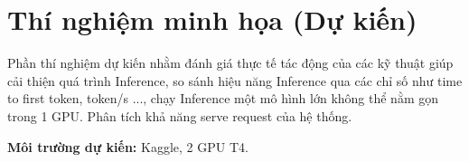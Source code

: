 \section{Thí nghiệm minh họa (Dự kiến)}

Phần thí nghiệm dự kiến nhằm đánh giá thực tế tác động của các kỹ thuật giúp cải thiện quá trình Inference, so sánh hiệu năng Inference qua các chỉ số như time to first token, token/s ..., chạy Inference một mô hình lớn không thể nằm gọn trong 1 GPU. Phân tích khả năng serve request của hệ thống.

\textbf{Môi trường dự kiến:} Kaggle, 2 GPU T4.